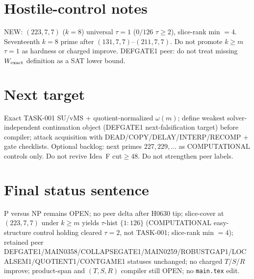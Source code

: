 \documentclass[11pt]{article}
\begin{document}
\section*{Hostile-control notes}
NEW: $(223,7,7)$ ($k{=}8$) universal $\tau{=}1$ ($0/126$ $\tau{\ge}2$), slice-rank min $=4$.
Seventeenth $k{=}8$ prime after $(131,7,7)$--$(211,7,7)$.
Do not promote $k{\ge}m$ $\tau{=}1$ as hardness or charged improve.
DEFGATE1 peer: do not treat missing $W_{\rm exact}$ definition as a SAT lower bound.

\section*{Next target}
Exact TASK-001 SU/vMS + quotient-normalized $\omega(m)$; define weakest solver-independent
continuation object (DEFGATE1 next-falsification target) before compiler;
attack acquisition with DEAD/COPY/DELAY/INTERP/RECOMP + gate checklists.
Optional backlog: next primes $227,229,\ldots$ as COMPUTATIONAL controls only.
Do not revive Idea~F cut$\ge48$. Do not strengthen peer labels.

\section*{Final status sentence}
P versus NP remains OPEN; no peer delta after H0630 tip; slice-cover at $(223,7,7)$ under $k{\ge}m$ yields $\tau$-hist $\{1{:}126\}$ (COMPUTATIONAL easy-structure control holding cleared $\tau{=}2$, not TASK-001; slice-rank min $=4$); retained peer DEFGATE1/MAIN0358/COLLAPSEGATE1/MAIN0259/ROBUSTGAP1/LOCALSEM1/QUOTIENT1/CONTGAME1 statuses unchanged; no charged $T$/$S$/$R$ improve; product-span and $(T,S,R)$ compiler still OPEN; no \texttt{main.tex} edit.
\end{document}
